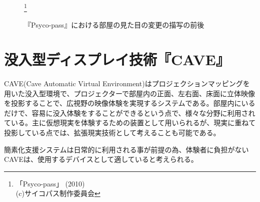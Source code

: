 \begin{figure}[htbp]
  \begin{minipage}{0.5\hsize}
    \begin{center}
      \caption{}
    \end{center}
  \end{minipage}
  \begin{minipage}{0.5\hsize}
    \begin{center}
    \end{center}
  \end{minipage}
  \caption{『Psyco-pass』における部屋の見た目の変更の描写の前後}
  \footnote{「Psyco-pass」 (2010)\\(c)サイコパス制作委員会}
\end{figure}

\section{没入型ディスプレイ技術『CAVE』}

CAVE(Cave Automatic Virtual Environment)\cite{cave}はプロジェクションマッピングを用いた没入型環境で、プロジェクターで部屋内の正面、左右面、床面に立体映像を投影することで、広視野の映像体験を実現するシステムである。部屋内にいるだけで、容易に没入体験をすることができるという点で、様々な分野に利用されている。主に仮想現実を体験するための装置として用いられるが、現実に重ねて投影している点では、拡張現実技術として考えることも可能である。

簡素化支援システムは日常的に利用される事が前提の為、体験者に負担がないCAVEは、使用するデバイスとして適していると考えられる。


